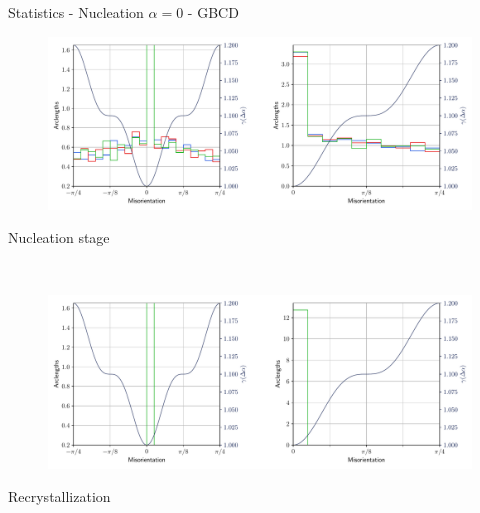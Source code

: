 \documentclass[usenames,dvipsnames]{beamer}
\begin{document}
\begin{frame}{Statistics - Nucleation $\alpha = 0$ - GBCD}
\small
    \begin{minipage}{\textwidth}
    \centering
    \vspace{-0.5em}
    \begin{figure}
    \centering
    \includegraphics[scale=0.33]{figures/stored_energy/SE/gbcd/000110_nuclconstant_set.pdf}
    \end{figure}
    \vspace{-2em}
    Nucleation stage
    \end{minipage}\\
    \begin{minipage}{\textwidth}
    \centering
    \begin{figure}
    \centering
    \includegraphics[scale=0.33]{figures/stored_energy/SE/gbcd/000240_nuclconstant_set.pdf}
    \end{figure}
    \vspace{-2em}
    Recrystallization
    \end{minipage}
\end{frame}
\end{document}

